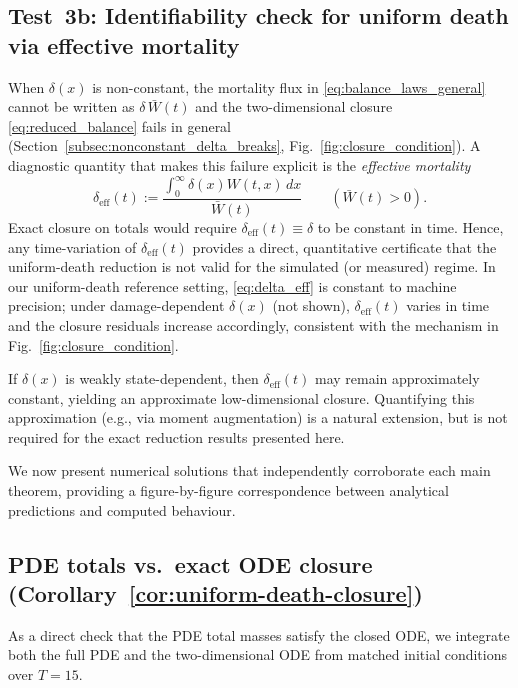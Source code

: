 \documentclass[pdflatex,sn-mathphys-ay]{sn-jnl}
\theoremstyle{thmstyleone}
\theoremstyle{definition}
\theoremstyle{remark}
\begin{document}
\subsection{Test~3b: Identifiability check for uniform death via effective mortality}
\label{subsubsec:identifiability_delta}

When $\delta(x)$ is non-constant, the mortality flux in \eqref{eq:balance_laws_general} cannot be written as $\delta\,\bar W(t)$ and the two-dimensional closure \eqref{eq:reduced_balance} fails in general (Section~\ref{subsec:nonconstant_delta_breaks}, Fig.~\ref{fig:closure_condition}). A diagnostic quantity that makes this failure explicit is the \emph{effective mortality}
\begin{equation}\label{eq:delta_eff}
\delta_{\mathrm{eff}}(t):=\frac{\int_0^\infty \delta(x)W(t,x)\,dx}{\bar W(t)}\qquad(\bar W(t)>0).
\end{equation}
Exact closure on totals would require $\delta_{\mathrm{eff}}(t)\equiv\delta$ to be constant in time. Hence, any time-variation of $\delta_{\mathrm{eff}}(t)$ provides a direct, quantitative certificate that the uniform-death reduction is not valid for the simulated (or measured) regime.
In our uniform-death reference setting, \eqref{eq:delta_eff} is constant to machine precision; under damage-dependent $\delta(x)$ (not shown), $\delta_{\mathrm{eff}}(t)$ varies in time and the closure residuals increase accordingly, consistent with the mechanism in Fig.~\ref{fig:closure_condition}.

If $\delta(x)$ is weakly state-dependent, then $\delta_{\mathrm{eff}}(t)$ may remain approximately constant, yielding an approximate low-dimensional closure. Quantifying this approximation (e.g., via moment augmentation) is a natural extension, but is not required for the exact reduction results presented here.

We now present numerical solutions that independently corroborate each main theorem,
providing a figure-by-figure correspondence between analytical predictions and computed behaviour.

\subsection{PDE totals vs.\ exact ODE closure (Corollary~\ref{cor:uniform-death-closure})}
\label{subsubsec:pde_vs_ode}
As a direct check that the PDE total masses satisfy the closed ODE, we integrate both the full
PDE and the two-dimensional ODE from matched initial conditions over $T=15$.
\end{document}
